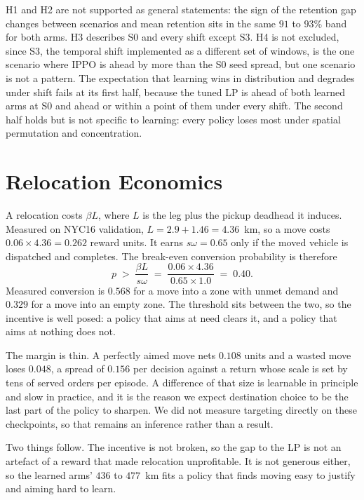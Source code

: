 \documentclass[conference]{IEEEtran}
\begin{document}
H1 and H2 are not supported as general statements: the sign of the retention
gap changes between scenarios and mean retention sits in the same $91$ to
$93\%$ band for both arms. H3 describes S0 and every shift except S3. H4 is
not excluded, since S3, the temporal shift implemented as a different set of
windows, is the one scenario where IPPO is ahead by more than the S0 seed
spread, but one scenario is not a pattern. The expectation that learning wins
in distribution and degrades under shift fails at its first half, because the
tuned LP is ahead of both learned arms at S0 and ahead or within a point of
them under every shift. The second half holds but is not specific to learning:
every policy loses most under spatial permutation and concentration.

\section{Relocation Economics}
\label{sec:economics}

A relocation costs $\beta L$, where $L$ is the leg plus the pickup deadhead it
induces. Measured on NYC16 validation, $L=2.9+1.46=4.36$~km, so a move costs
$0.06\times4.36=0.262$ reward units. It earns $s\omega=0.65$ only if the
moved vehicle is dispatched and completes. The break-even conversion
probability is therefore
\begin{equation}
  p \;>\; \frac{\beta L}{s\omega}
      \;=\; \frac{0.06\times4.36}{0.65\times1.0}
      \;=\; 0.40 .
  \label{eq:breakeven}
\end{equation}
Measured conversion is $0.568$ for a move into a zone with unmet demand and
$0.329$ for a move into an empty zone. The threshold sits between the two, so
the incentive is well posed: a policy that aims at need clears it, and a
policy that aims at nothing does not.

The margin is thin. A perfectly aimed move nets $0.108$ units and a wasted
move loses $0.048$, a spread of $0.156$ per decision against a return whose
scale is set by tens of served orders per episode. A difference of that size
is learnable in principle and slow in practice, and it is the reason we expect
destination choice to be the last part of the policy to sharpen. We did not
measure targeting directly on these checkpoints, so that remains an inference
rather than a result.

Two things follow. The incentive is not broken, so the gap to the LP is not an
artefact of a reward that made relocation unprofitable. It is not generous
either, so the learned arms' $436$ to $477$~km fits a policy that finds moving
easy to justify and aiming hard to learn.
\end{document}
